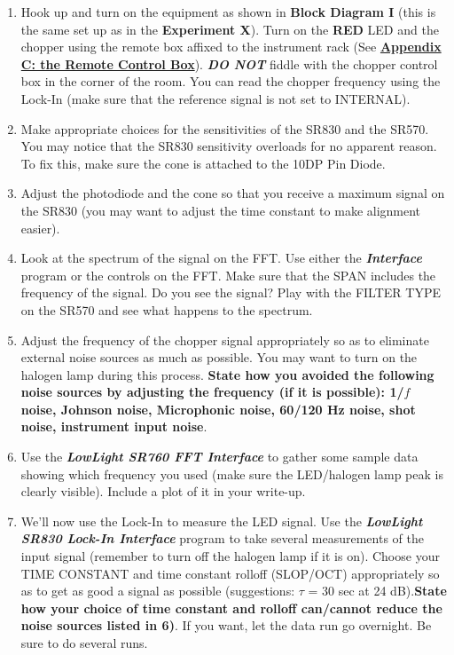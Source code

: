 \documentclass{../lab}
\begin{document}
\begin{enumerate}
    \item Hook up and turn on the equipment as shown in \textbf{Block Diagram I} (this is the same set up as in the \textbf{Experiment X}). Turn on the \textbf{RED} LED and the chopper using the remote box affixed to the instrument rack (See \href{http://dev-physicsadv.pantheon.berkeley.edu/node/98}{\textbf{Appendix C: the Remote Control Box}}). \emph{\textbf{DO NOT}} fiddle with the chopper control box in the corner of the room. You can read the chopper frequency using the Lock-In (make sure that the reference signal is not set to INTERNAL).

    \item Make appropriate choices for the sensitivities of the SR830 and the SR570. You may notice that the SR830 sensitivity overloads for no apparent reason. To fix this, make sure the cone is attached to the 10DP Pin Diode.

    \item Adjust the photodiode and the cone so that you receive a maximum signal on the SR830 (you may want to adjust the time constant to make alignment easier).

    \item Look at the spectrum of the signal on the FFT. Use either the \emph{\textbf{Interface}} program or the controls on the FFT. Make sure that the SPAN includes the frequency of the signal. Do you see the signal? Play with the FILTER TYPE on the SR570 and see what happens to the spectrum.

    \item Adjust the frequency of the chopper signal appropriately so as to eliminate external noise sources as much as possible. You may want to turn on the halogen lamp during this process. \textbf{State how you avoided the following noise sources by adjusting the frequency (if it is possible): 1/$f$ noise, Johnson noise, Microphonic noise, 60/120 Hz noise, shot noise, instrument input noise}.

    \item Use the \emph{\textbf{LowLight SR760 FFT Interface}} to gather some sample data showing which frequency you used (make sure the LED/halogen lamp peak is clearly visible). Include a plot of it in your write-up.

    \item We'll now use the Lock-In to measure the LED signal. Use the \emph{\textbf{LowLight SR830 Lock-In Interface}} program to take several measurements of the input signal (remember to turn off the halogen lamp if it is on). Choose your TIME CONSTANT and time constant rolloff (SLOP/OCT) appropriately so as to get as good a signal as possible (suggestions: $\tau$ = 30 sec at 24 dB).\textbf{State how your choice of time constant and rolloff can/cannot reduce the noise sources listed in 6)}. If you want, let the data run go overnight. Be sure to do several runs.


\end{enumerate}
\end{document}
